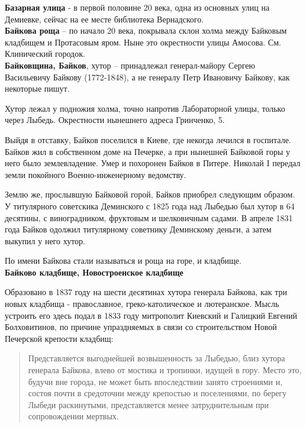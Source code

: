 \textbf{Базарная улица} - в первой половине 20 века, одна из основных улиц на Демиевке, сейчас на ее месте библиотека Вернадского.\\


\textbf{Байкова роща} – по начало 20 века, покрывала склон холма между Байковым кладбищем и Протасовым яром. Ныне это окрестности улицы Амосова. См. Клинический городок.\\

\textbf{Байковщина, Байков}, хутор – принадлежал генерал-майору Сергею Васильевичу Байкову (1772-1848), а не генералу Петр Ивановичу Байкову, как некоторые пишут.

Хутор лежал у подножия холма, точно напротив Лабораторной улицы, только через Лыбедь. Окрестности нынешнего адреса Гринченко, 5.

Выйдя в отставку, Байков поселился в Киеве, где некогда лечился в госпитале. Байков жил в собственном доме на Печерке, а при нынешней Байковой горы у него было землевладение. Умер и похоронен Байков в Питере. Николай I передал земли покойного Военно-инженерному ведомству.

Землю же, прослывшую Байковой горой, Байков приобрел следующим образом. У титулярного советскика Деминского с 1825 года над Лыбедью был хутор в 64 десятины, с виноградником, фруктовым и шелковичным садами. В апреле 1831 года Байков одолжил титулярному советнику Деминскому деньги, а затем выкупил у него хутор.

По имени Байкова стали называться и роща на горе, и кладбище.\\

\textbf{Байково кладбище, Новостроенское кладбище}

Образовано в 1837 году на шести десятинах хутора генерала Байкова, как три новых кладбища - православное, греко-католическое и лютеранское. Мысль устроить его здесь подал в 1833 году митрополит Киевский и Галицкий Евгений Болховитинов, по причине упраздняемых в связи со строительством Новой Печерской крепости кладбищ:

\begin{quotation}
Представляется выгоднейшей возвышенность за Лыбедью, близ хутора генерала Байкова, влево от мостика и тропинки, идущей в гору. Место это, будучи вне города, не может быть впоследствии занято строениями и, состоя почти в средоточии между крепостью и поселениями, по берегу Лыбеди раскинутыми, представляется менее затруднительным при сопровождении мертвых.\end{quotation}



